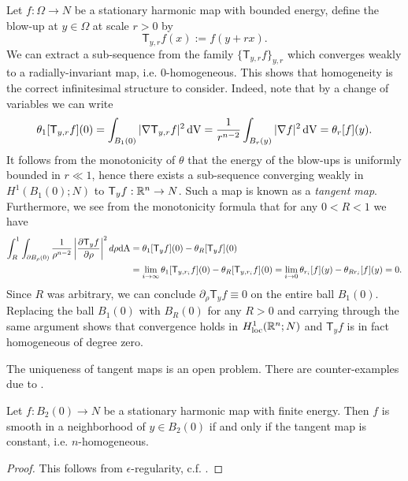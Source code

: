 Let $f : \Omega \to N$ be a stationary harmonic map with bounded energy, define the blow-up at $y \in \Omega$ at scale $r > 0$ by
	\[ \mathsf T_{y, r} f (x) := f(y + r x). \]
We can extract a sub-sequence from the family $\{ \mathsf T_{y, r} f \}_{y, r}$ which converges weakly to a radially-invariant map, i.e. $0$-homogeneous. This shows that homogeneity is the correct infinitesimal structure to consider. Indeed, note that by a change of variables we can write
	\[ \theta_1 [\mathsf T_{y, r} f] (0) = \int_{B_1 (0)} |\nabla \mathsf T_{y, r} f|^2 \, \mathrm{dV} = \frac{1}{r^{n - 2}} \int_{B_r (y)} |\nabla f|^2 \, \mathrm{dV} = \theta_r [f](y). \]
It follows from the monotonicity of $\theta$ that the energy of the blow-ups is uniformly bounded in $r \ll 1$, hence there exists a sub-sequence converging weakly in $H^1 (B_1 (0) ; N)$ to $\mathsf T_y f : \mathbb R^n \to N$. Such a map is known as a \emph{tangent map}. Furthermore, we see from the monotonicity formula that for any $0 < R < 1$ we have
	\begin{align*}
		\int_R^1  \int_{\partial B_\rho (0)} \frac{1}{\rho^{n - 2}} \left| \frac{\partial \mathsf T_y f}{\partial \rho} \right|^2 d\rho \mathrm{dA}
			&=	 \theta_1 [\mathsf T_y f](0) - \theta_R [\mathsf T_y f] (0)\\
			&= \lim_{i \to \infty} \theta_1 [\mathsf T_{y, r_i} f] (0) - \theta_R [\mathsf T_{y, r_i} f] (0)= \lim_{i \to 0} \theta_{r_i} [f] (y) - \theta_{Rr_i} [ f](y) = 0. 
	\end{align*}	 
Since $R$ was arbitrary, we can conclude $\partial_\rho \mathsf T_y f\equiv 0$ on the entire ball $B_1 (0)$. Replacing the ball $B_1 (0)$ with $B_R (0)$ for any $R > 0$ and carrying through the same argument shows that convergence holds in $H^1_{\mathrm{loc}} (\mathbb R^n; N)$ and $\mathsf T_y f$ is in fact homogeneous of degree zero. 

\begin{remark}
	The uniqueness of tangent maps is an open problem. There are counter-examples due to \cite{White1991}.
\end{remark}

\begin{theorem}
	Let $f: B_2 (0) \to N$ be a stationary harmonic map with finite energy. Then $f$ is smooth in a neighborhood of $y \in B_2 (0)$ if and only if the tangent map is constant, i.e. $n$-homogeneous. 
\end{theorem}	

\begin{proof}
	This follows from $\epsilon$-regularity, c.f. \cite[Chapter 3.2]{Simon1996}. 
\end{proof}

